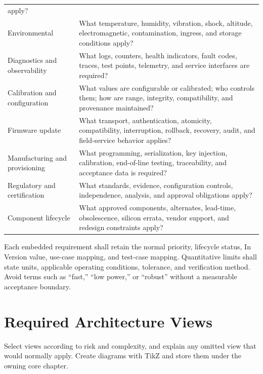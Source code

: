 \begin{tabularx}{\linewidth}{L{3.7cm}Y}
apply?\\
Environmental & What temperature, humidity, vibration, shock, altitude,
electromagnetic, contamination, ingress, and storage conditions apply?\\
Diagnostics and observability & What logs, counters, health indicators, fault
codes, traces, test points, telemetry, and service interfaces are required?\\
Calibration and configuration & What values are configurable or calibrated;
who controls them; how are range, integrity, compatibility, and provenance
maintained?\\
Firmware update & What transport, authentication, atomicity, compatibility,
interruption, rollback, recovery, audit, and field-service behavior applies?\\
Manufacturing and provisioning & What programming, serialization, key
injection, calibration, end-of-line testing, traceability, and acceptance data
is required?\\
Regulatory and certification & What standards, evidence, configuration
controls, independence, analysis, and approval obligations apply?\\
Component lifecycle & What approved components, alternates, lead-time,
obsolescence, silicon errata, vendor support, and redesign constraints apply?\\
\end{tabularx}
\normalsize

Each embedded requirement shall retain the normal priority, lifecycle status,
In Version value, use-case mapping, and test-case mapping. Quantitative limits
shall state units, applicable operating conditions, tolerance, and verification
method. Avoid terms such as ``fast,'' ``low power,'' or ``robust'' without a
measurable acceptance boundary.

\section{Required Architecture Views}
Select views according to risk and complexity, and explain any omitted view
that would normally apply. Create diagrams with TikZ and store them under the
owning core chapter.

